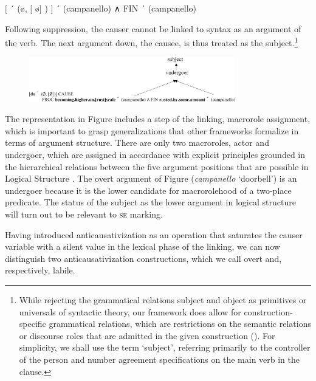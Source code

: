 \documentclass[output=paper,colorlinks,citecolor=brown
]{langscibook}
\begin{document}
\ea  \label{bentley_example_50}
    $\lbrack$ ´ (\o, $\lbrack$ \o $\rbrack$ ) $\rbrack$ ´ (campanello) ∧ FIN ´ (campanello)
\z

Following suppression, the causer cannot be linked to syntax as an argument of the verb. The next argument down, the causee, is thus treated as the subject.\footnote{While rejecting the grammatical relations subject and object as primitives or universals of syntactic theory, our framework does allow for construction-specific grammatical relations, which are restrictions on the semantic relations or discourse roles that are admitted in the given construction (\cites[242—309]{vanvalin2023principles}{lapolla2023grammatical}). For simplicity, we shall use the term ‘subject’, referring primarily to the controller of the person and number agreement specifications on the main verb in the clause.}

\begin{figure}
\centering
\includegraphics[width=0.8\textwidth]{figures/bentley_figure3.png}
\caption{}
\label{fig:bentley_figure_3}
\end{figure}    


The representation in Figure  includes a step of the linking, macrorole assignment, which is important to grasp generalizations that other frameworks formalize in terms of argument structure. There are only two macroroles, actor and undergoer, which are assigned in accordance with explicit principles grounded in the hierarchical relations between the five argument positions that are possible in Logical Structure \citep[82—198]{vanvalin1997syntax}. The overt argument of Figure  (\textit{campanello} ‘doorbell’) is an undergoer because it is the lower candidate for macrorolehood of a two-place predicate. The status of the subject as the lower argument in logical structure will turn out to be relevant to \textsc{se} marking. 

Having introduced anticausativization as an operation that saturates the causer variable with a silent value in the lexical phase of the linking, we can now distinguish two anticausativization constructions, which we call overt and, respectively, labile. 
\end{document}

